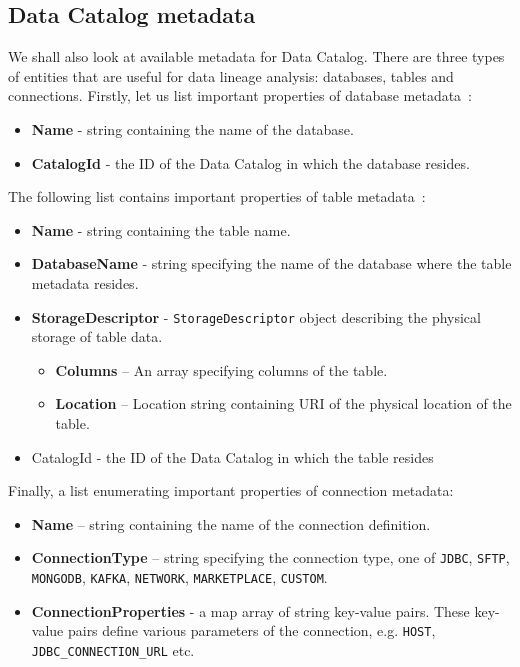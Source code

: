 \subsection{Data Catalog metadata}
We shall also look at available metadata for Data Catalog. There are three types of entities that are useful for data lineage analysis: databases, tables and connections. Firstly, let us list important properties of database metadata~\cite{gluedatabase}:
\begin{itemize}
    \item \textbf{Name} - string containing the name of the database.
    \item \textbf{CatalogId} - the ID of the Data Catalog in which the database resides.
\end{itemize}
The following list contains important properties of table metadata~\cite{gluetable}:
\begin{itemize}
    \item \textbf{Name} - string containing the table name.
    \item \textbf{DatabaseName}  - string specifying the name of the database where the table metadata resides.
    \item \textbf{StorageDescriptor} - \texttt{StorageDescriptor} object describing the physical storage of table data.
    \begin{itemize}
        \item \textbf{Columns} – An array specifying columns of the table.
        \item \textbf{Location} – Location string containing URI of the physical location of the table.
    \end{itemize}
    \item CatalogId - the ID of the Data Catalog in which the table resides 
\end{itemize}
Finally, a list enumerating important properties of connection metadata:
\begin{itemize}
    \item \textbf{Name} – string containing the name of the connection definition.
    \item \textbf{ConnectionType} – string specifying the connection type, one of \texttt{JDBC}, \texttt{SFTP}, \texttt{MONGODB}, \texttt{KAFKA}, \texttt{NETWORK}, \texttt{MARKETPLACE}, \texttt{CUSTOM}.
    \item \textbf{ConnectionProperties} - a map array of string key-value pairs. These key-value pairs define various parameters of the connection, e.g. \texttt{HOST}, \texttt{JDBC\_CONNECTION\_URL} etc.
\end{itemize}
